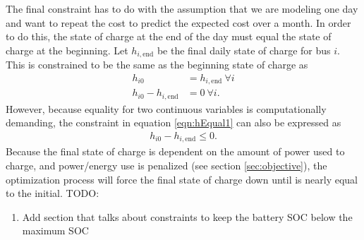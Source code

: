 \par The final constraint has to do with the assumption that we are modeling one day and want to repeat the cost to predict the expected cost over a month. In order to do this, the state of charge at the end of the day must equal the state of charge at the beginning. Let $h_{i,\text{end}}$ be the final daily state of charge for bus $i$. This is constrained to be the same as the beginning state of charge as
\begin{equation} \label{eqn:hEqual1} \begin{aligned}
	h_{i0} &= h_{i,\text{end}} \ \forall i \\
	h_{i0} - h_{i,\text{end}} &= 0 \ \forall i.  
\end{aligned} \end{equation}
However, because equality for two continuous variables is computationally demanding, the constraint in equation \ref{eqn:hEqual1} can also be expressed as 
\begin{equation} \begin{aligned}
	h_{i0} - h_{i,\text{end}} \le 0.
\end{aligned} \end{equation}
Because the final state of charge is dependent on the amount of power used to charge, and power/energy use is penalized (see section \ref{sec:objective}), the optimization process will force the final state of charge down until is nearly equal to the initial.
TODO:
\begin{enumerate}
	\item Add section that talks about constraints to keep the battery SOC below the maximum SOC
\end{enumerate}
